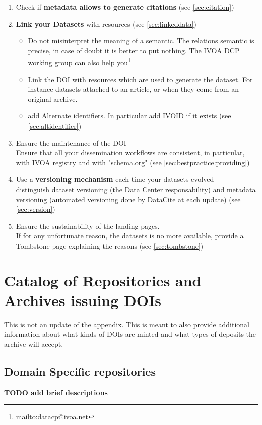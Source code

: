 \documentclass[11pt,a4paper]{ivoa}
\begin{document}
\begin{enumerate}
	\item Check if \textbf{metadata allows to generate citations} (see \ref{sec:citation})
	\item \textbf{Link your Datasets} with resources (see \ref{sec:linkeddata})
	\begin{itemize}	
		\item Do not misinterpret the meaning of a semantic. The relations semantic is precise, in case of doubt it is better to put nothing. 
		The IVOA DCP working group can also help you\footnote{\url{mailto:datacp@ivoa.net}}
		\item Link the DOI with resources which are used to generate the dataset. For instance datasets attached to an article, or when they come from an original archive.
		\item add Alternate identifiers. In particular add IVOID if it exists (see \ref{sec:altidentifier})
	\end{itemize}
	\item Ensure the maintenance of the DOI\\
	Ensure that all your dissemination workflows are consistent, in particular, with IVOA registry and with "schema.org" (see \ref{sec:bestpractice:providing})
	\item Use a \textbf{versioning mechanism} each time your datasets evolved\\
	distinguish dataset versioning (the Data Center responsability) and metadata versioning (automated versioning done by DataCite at each update) (see \ref{sec:version})
	\item Ensure the sustainability of the landing pages.\\
	If for any unfortunate reason, the datasets is no more available, provide a Tombstone page explaining the reasons (see \ref{sec:tombstone})
\end{enumerate}


\appendix
\section{Catalog of Repositories and Archives issuing DOIs}
\label{sec:catalog}

This is not an update of the \citet{2022ApJS..260....5C} appendix. 
This is meant to also provide additional information about what kinds of DOIs are minted and what types of deposits the archive will accept.

\subsection{Domain Specific repositories}
\textbf{\color{red}  TODO add brief descriptions}\\
\end{document}

